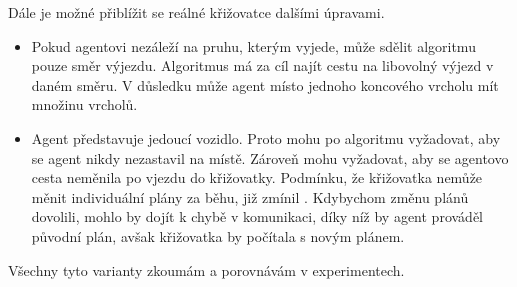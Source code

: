 Dále je možné přiblížit se reálné křižovatce dalšími úpravami.
\begin{itemize}
	\item Pokud agentovi nezáleží na pruhu, kterým vyjede, může sdělit algoritmu pouze směr výjezdu.
	Algoritmus má za cíl najít cestu na libovolný výjezd v daném směru.
	V důsledku může agent místo jednoho koncového vrcholu mít množinu vrcholů.
	\item Agent představuje jedoucí vozidlo.
	Proto mohu po algoritmu vyžadovat, aby se agent nikdy nezastavil na místě.
	Zároveň mohu vyžadovat, aby se agentovo cesta neměnila po vjezdu do křižovatky.
	Podmínku, že křižovatka nemůže měnit individuální plány za běhu, již zmínil \citet{Dresner}.
	Kdybychom změnu plánů dovolili, mohlo by dojít k chybě v komunikaci, díky níž by agent prováděl původní plán,
	avšak křižovatka by počítala s novým plánem.
\end{itemize}

Všechny tyto varianty zkoumám a porovnávám v experimentech.

